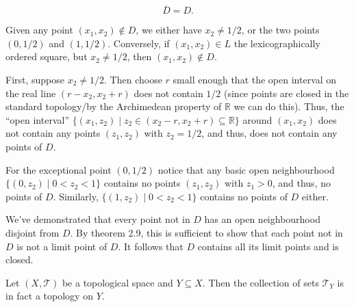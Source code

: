 \documentclass[12 pt, letterpaper]{hmcpset}
\begin{document}
\begin{solution}
	\[
		\boxed{
			\overline{D} = D.
		}
	\]
 
	Given any point $(x_{1}, x_{2}) \notin D$, we either have $x_{2} \neq 1 / 2$, or the two points  $(0, 1 / 2)$ and $(1, 1/2)$. Conversely, if $(x_{1}, x_{2}) \in L$ the lexicographically ordered square, but $x_{2} \neq 1 / 2$, then  $(x_{1}, x_{2}) \notin D$.

	First, suppose $x_{2} \neq 1 / 2$. Then choose $r$ small enough that the open interval on the real line  $(r - x_{2}, x_{2} + r)$ does not contain $1 / 2$ (since points are closed in the standard topology/by the Archimedean property of $\mathbb{R}$ we can do this). Thus, the ``open interval''  $\{ (x_{1}, z_{2}) \mid z_{2} \in (x_{2} - r, x_{2} + r) \subseteq \mathbb{R}  \}$ around $(x_{1}, x_{2})$ does not contain any points $(z_{1}, z_{2})$ with $z_{2} = 1 / 2$, and thus, does not contain any points of $D$.

	For the exceptional point $(0, 1 / 2)$ notice that any basic open neighbourhood $\{ (0, z_{2}) \mid 0 < z_{2} < 1 \}$ contains no points  $(z_{1}, z_{2})$ with $z_{1} > 0$, and thus, no points of $D$. Similarly, $\{ (1, z_{2}) \mid 0 < z_{2} < 1 \}$ contains no points of $D$ either.

	We've demonstrated that every point not in $D$ has an open neighbourhood disjoint from $D$. By theorem 2.9, this is sufficient to show that each point not in $D$ is not a limit point of $D$. It follows that $D$ contains all its limit points and is closed.
\end{solution}	

\pagebreak

\begin{problem}[3.25.]
	Let $(X, \mathcal{T})$ be a topological space and $Y \subseteq X$. Then the collection of sets $\mathcal{T}_{Y}$ is in fact a topology on $Y$.
\end{problem}
\end{document}
